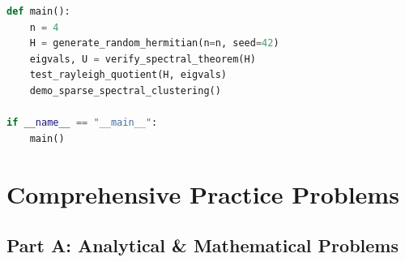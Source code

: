 \begin{lstlisting}[language=Python, caption={Hermitian Matrix Decomposition and Rayleigh Quotient Verification in Python.}]
def main():
    n = 4
    H = generate_random_hermitian(n=n, seed=42)
    eigvals, U = verify_spectral_theorem(H)
    test_rayleigh_quotient(H, eigvals)
    demo_sparse_spectral_clustering()

if __name__ == "__main__":
    main()
\end{lstlisting}

\section{Comprehensive Practice Problems}

\subsection*{Part A: Analytical \& Mathematical Problems}

